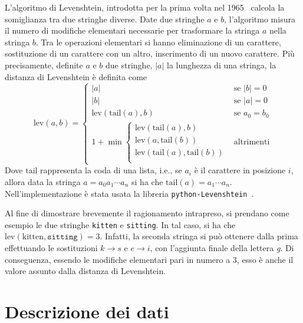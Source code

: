 L'algoritmo di Levenshtein, introdotta per la prima volta nel
1965~\cite{levenshtein1966} calcola la somiglianza tra due stringhe diverse.
Date due stringhe $a$ e $b$, l'algoritmo misura il numero di modifiche
elementari necessarie per trasformare la stringa $a$ nella stringa $b$.
Tra le operazioni elementari si hanno eliminazione di un carattere,
sostituzione di un carattere con un altro, inserimento di un nuovo carattere.
Più precisamente, definite $a$ e $b$ due stringhe, $|a|$ la lunghezza di una
stringa, la distanza di Levenshtein è definita come
\begin{equation*}
  \text{lev}(a, b) =
  \begin{cases}
    |a| & \text{se } |b| = 0 \\
    |b| & \text{se } |a| = 0 \\
    \text{lev}(\text{tail}(a), b) & \text{se } a_0 = b_0 \\
    1 + \min\begin{cases}
      \text{lev}(\text{tail}(a), b) \\
      \text{lev}(a, \text{tail}(b)) \\
      \text{lev}(\text{tail}(a), \text{tail}(b)) \\
    \end{cases}
    & \text{altrimenti}
  \end{cases}
\end{equation*}
%
Dove $\text{tail}$ rappresenta la coda di una lista, i.e., se $a_i$ è il
carattere in posizione $i$, allora data la stringa $a = a_0a_1\cdots a_n$ si ha
che $\text{tail}(a) = a_1\cdots a_n$.
Nell'implementazione è stata usata la libreria
\texttt{python-Levenshtein}~\cite{pythonLevenshtein}.

Al fine di dimostrare brevemente il ragionamento intrapreso, si prendano come
esempio le due stringhe \texttt{kitten} e \texttt{sitting}. In tal caso, si
ha che $\text{lev}(\text{kitten}, \texttt{sitting}) = 3$. Infatti, la seconda
stringa si può ottenere dalla prima effettuando le sostituzioni $k \to s$
e $e \to i$, con l'aggiunta finale della lettera \textit{g}.
Di conseguenza, essendo le modifiche elementari pari in numero a 3, esso è
anche il valore assunto dalla distanza di Levenshtein.

\section{Descrizione dei dati}\label{sec:descrizionedati}

